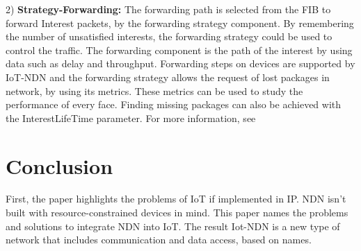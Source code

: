 \documentclass[conference]{IEEEtran}
\begin{document}
  2) \textbf{Strategy-Forwarding:}
  The forwarding path is selected from the FIB to forward Interest packets, by the forwarding strategy component. 
  By remembering the number of unsatisfied interests, the forwarding strategy could be used to control the traffic.
  The forwarding component is the path of the interest by using data such as delay and throughput. 
  Forwarding steps on devices are supported by IoT-NDN and the forwarding strategy allows the request of lost packages in network, by using its metrics. 
  These metrics can be used to study the performance of every face.
  Finding missing packages can also be achieved with the InterestLifeTime parameter. For more information, see \cite{b6}
  
  \section{Conclusion}
  First, the paper highlights the problems of IoT if implemented in IP. 
  NDN isn't built with resource-constrained devices in mind. This paper names the problems and solutions to integrate NDN into IoT.
  The result Iot-NDN is a new type of network that includes communication and data access, based on names.
  
\end{document}
